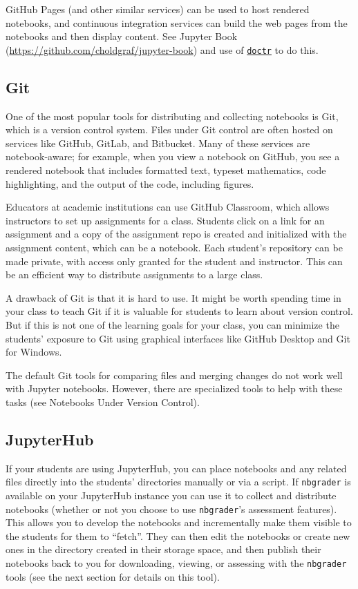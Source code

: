 \documentclass[]{book}
\begin{document}
GitHub Pages (and other similar services) can be used to host rendered
notebooks, and continuous integration services can build the web pages
from the notebooks and then display content. See Jupyter Book
(\url{https://github.com/choldgraf/jupyter-book}) and use of
\href{https://drdoctr.github.io/doctr}{\texttt{doctr}} to do this.

\subsection{Git}\label{git}

One of the most popular tools for distributing and collecting notebooks
is Git, which is a version control system. Files under Git control are
often hosted on services like GitHub, GitLab, and Bitbucket. Many of
these services are notebook-aware; for example, when you view a notebook
on GitHub, you see a rendered notebook that includes formatted text,
typeset mathematics, code highlighting, and the output of the code,
including figures.

Educators at academic institutions can use GitHub Classroom, which
allows instructors to set up assignments for a class. Students click on
a link for an assignment and a copy of the assignment repo is created
and initialized with the assignment content, which can be a notebook.
Each student's repository can be made private, with access only granted
for the student and instructor. This can be an efficient way to
distribute assignments to a large class.

A drawback of Git is that it is hard to use. It might be worth spending
time in your class to teach Git if it is valuable for students to learn
about version control. But if this is not one of the learning goals for
your class, you can minimize the students' exposure to Git using
graphical interfaces like GitHub Desktop and Git for Windows.

The default Git tools for comparing files and merging changes do not
work well with Jupyter notebooks. However, there are specialized tools
to help with these tasks (see Notebooks Under Version Control).

\subsection{JupyterHub}\label{jupyterhub}

If your students are using JupyterHub, you can place notebooks and any
related files directly into the students' directories manually or via a
script. If \texttt{nbgrader} is available on your JupyterHub instance
you can use it to collect and distribute notebooks (whether or not you
choose to use \texttt{nbgrader}'s assessment features). This allows you
to develop the notebooks and incrementally make them visible to the
students for them to ``fetch''. They can then edit the notebooks or
create new ones in the directory created in their storage space, and
then publish their notebooks back to you for downloading, viewing, or
assessing with the \texttt{nbgrader} tools (see the next section for
details on this tool).
\end{document}
